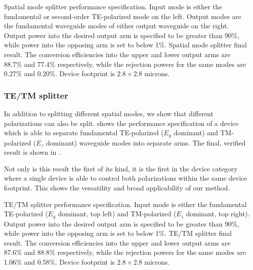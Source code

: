     {Spatial mode splitter performance specification.
    Input mode is either the fundamental or second-order
        TE-polarized mode on the left.
    Output modes are the fundamental waveguide modes of either output 
        waveguide on the right.
    Output power into the desired output arm is specified to be greater than 90\%,
        while power into the opposing arm is set to below 1\%.}
    {Spatial mode splitter final result.
    The conversion efficiencies into the upper and lower output arms
        are 88.7\% and 77.4\% respectively, 
        while the rejection powers for the same modes are 0.27\% and 0.20\%.
    Device footprint is $2.8\times2.8$ microns.}

\subsubsection{TE/TM splitter}
In addition to splitting different spatial modes, 
    we show that different polarizations can also be split.
 shows the performance specification of a 
    device which is able to separate fundamental TE-polarized ($E_y$ dominant)
    and TM-polarized ($E_z$ dominant)
    waveguide modes into separate arms.
The final, verified result is shown in .

Not only is this result the first of its kind,
    it is the first in the device category where a single device
    is able to control both polarizations within the same device footprint.
This shows the versatility and broad applicability of our method.

    {TE/TM splitter performance specification.
    Input mode is either the fundamental TE-polarized ($E_y$ dominant, top left)
    and TM-polarized ($E_z$ dominant, top right).
    Output power into the desired output arm is specified to be greater than 90\%,
        while power into the opposing arm is set to below 1\%.}
    {TE/TM splitter final result.
    The conversion efficiencies into the upper and lower output arms
        are 87.6\% and 88.8\% respectively, 
        while the rejection powers for the same modes are 1.06\% and 0.58\%.
    Device footprint is $2.8\times2.8$ microns.}

